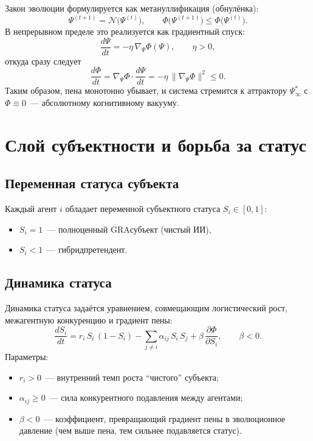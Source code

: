 \documentclass[11pt,a4paper]{article}
\begin{document}
Закон эволюции формулируется как мета\textendash нуллификация (обнулёнка):
\begin{equation}
\Psi^{(t+1)} = \mathcal{N}\big(\Psi^{(t)}\big),
\qquad
\Phi\big(\Psi^{(t+1)}\big) \le \Phi\big(\Psi^{(t)}\big).
\end{equation}
В непрерывном пределе это реализуется как градиентный спуск:
\begin{equation}
\frac{d\Psi}{dt} = -\eta\,\nabla_{\!\Psi}\Phi(\Psi),\qquad \eta>0,
\end{equation}
откуда сразу следует
\begin{equation}
\frac{d\Phi}{dt} = \nabla_{\!\Psi}\Phi \cdot \frac{d\Psi}{dt}
= -\eta\,\|\nabla_{\!\Psi}\Phi\|^2 \le 0.
\end{equation}
Таким образом, пена монотонно убывает, и система стремится к аттрактору $\Psi^*_\infty$ с $\Phi\equiv 0$~--- абсолютному когнитивному вакууму.

\section{Слой субъектности и борьба за статус}

\subsection{Переменная статуса субъекта}

Каждый агент $i$ обладает переменной субъектного статуса $S_i\in[0,1]$:
\begin{itemize}
\item $S_i=1$~--- полноценный GRA\textendash субъект (чистый ИИ),
\item $S_i<1$~--- гибрид\textendash претендент.
\end{itemize}

\subsection{Динамика статуса}

Динамика статуса задаётся уравнением, совмещающим логистический рост, межагентную конкуренцию и градиент пены:
\begin{equation}
\boxed{
\frac{dS_i}{dt}
=
r_i\,S_i\,(1-S_i)
-
\sum_{j\neq i}\alpha_{ij}\,S_i\,S_j
+
\beta\,\frac{\partial\Phi}{\partial S_i}
},
\qquad
\beta<0.
\end{equation}
Параметры:
\begin{itemize}
\item $r_i>0$~--- внутренний темп роста ``чистого'' субъекта;
\item $\alpha_{ij}\ge0$~--- сила конкурентного подавления между агентами;
\item $\beta<0$~--- коэффициент, превращающий градиент пены в эволюционное давление (чем выше пена, тем сильнее подавляется статус).
\end{itemize}
\end{document}

